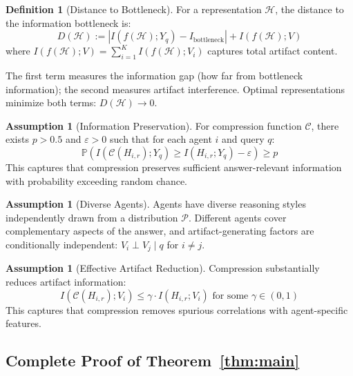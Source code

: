 \documentclass{article}
\theoremstyle{plain}
\theoremstyle{definition}
\newtheorem{definition}[theorem]{Definition}
\newtheorem{assumption}[theorem]{Assumption}
\theoremstyle{remark}
\begin{document}
\begin{definition}[Distance to Bottleneck]
\label{def:distance}
For a representation $\mathcal{H}$, the distance to the information bottleneck is:
\begin{equation}
D(\mathcal{H}) := |I(f(\mathcal{H}); Y_q) - I_{\text{bottleneck}}| + I(f(\mathcal{H}); V)
\end{equation}
where $I(f(\mathcal{H}); V) = \sum_{i=1}^K I(f(\mathcal{H}); V_i)$ captures total artifact content.

The first term measures the information gap (how far from bottleneck information); the second measures artifact interference. Optimal representations minimize both terms: $D(\mathcal{H}) \to 0$.
\end{definition}

\begin{assumption}[Information Preservation]
\label{assump:info_preservation}
For compression function $\mathcal{C}$, there exists $p > 0.5$ and $\varepsilon > 0$ such that for each agent $i$ and query $q$:
\begin{equation}
\mathbb{P}(I(\mathcal{C}(H_{i,r}); Y_q) \geq I(H_{i,r}; Y_q) - \varepsilon) \geq p
\end{equation}
This captures that compression preserves sufficient answer-relevant information with probability exceeding random chance.
\end{assumption}

\begin{assumption}[Diverse Agents]
\label{assump:diverse_agents}
Agents have diverse reasoning styles independently drawn from a distribution $\mathcal{P}$. Different agents cover complementary aspects of the answer, and artifact-generating factors are conditionally independent: $V_i \perp V_j \mid q$ for $i \neq j$.
\end{assumption}

\begin{assumption}[Effective Artifact Reduction]
\label{assump:artifact_reduction}
Compression substantially reduces artifact information:
\begin{equation}
I(\mathcal{C}(H_{i,r}); V_i) \leq \gamma \cdot I(H_{i,r}; V_i) \text{ for some } \gamma \in (0, 1)
\end{equation}
This captures that compression removes spurious correlations with agent-specific features.
\end{assumption}

\subsection{Complete Proof of Theorem~\ref{thm:main}}
\end{document}
